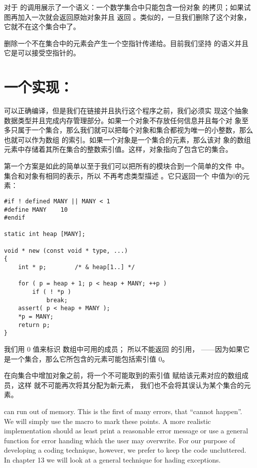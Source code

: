 对于 的调用展示了一个语义：一个数学集合中只能包含一份对象
 的拷贝；如果试图再加入一次就会返回原始对象并且 返回
。类似的，一旦我们删除了这个对象，它就不在这个集合中了。

删除一个不在集合中的元素会产生一个空指针传递给。目前我们坚持
 的语义并且它是可以接受空指针的。

\section{一个实现：}
 可以正确编译，但是我们在链接并且执行这个程序之前，我们必须实
现这个抽象数据类型并且完成内存管理部分。如果一个对象不存放任何信息并且每个对
象至多只属于一个集合，那么我们就可以把每个对象和集合都视为唯一的小整数，那么
也就可以作为数组 的索引。如果一个对象是一个集合的元素，那么该对
象的数组元素中存储着其所在集合的整数索引值。这样，对象指向了包含它的集合。

第一个方案是如此的简单以至于我们可以把所有的模块合到一个简单的文件
 中。集合和对象有相同的表示，所以 不再考虑类型描述
。它只返回一个 中值为0的元素：
\begin{lstlisting}
#if ! defined MANY || MANY < 1
#define MANY	10
#endif

static int heap [MANY];

void * new (const void * type, ...)
{
	int * p;		/* & heap[1..] */

	for ( p = heap + 1; p < heap + MANY; ++p )
		if ( ! *p )
			break;
	assert( p < heap + MANY );
	*p = MANY;
	return p;
}
\end{lstlisting}
我们用 0 值来标识  数组中可用的成员；
所以不能返回  的引用，
——因为如果它是一个集合，那么它所包含的元素可能包括索引值 0。

在向集合中增加对象之前，将一个不可能取到的索引值
 赋给该元素对应的数组成员，这样
 就不可能再次将其分配为新元素，
我们也不会将其误认为某个集合的元素。

 can run out of memory. This is the first of many errors, that
``cannot happen''. We will simply use the  macro
 to mark these points. A more realistic implementation should
as least print a reasonable error message or use a general function for
error handing which the user may overwrite. For our purpose of developing a
coding technique, however, we prefer to keep the code uncluttered. In
chapter 13 we will look at a general technique for hading exceptions.

